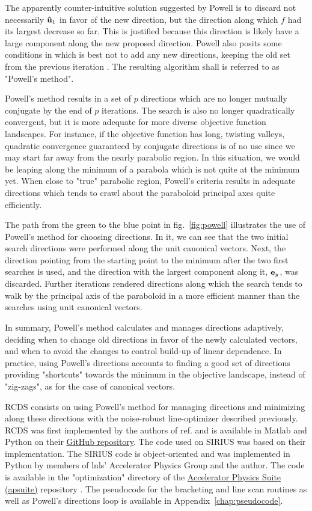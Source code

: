 The apparently counter-intuitive solution suggested by Powell is to discard not necessarily $\vu{u}_1$ in favor of the new direction, but the direction along which $f$ had its largest decrease so far. This is justified because this direction is likely have a large component along the new proposed  direction. Powell also posits some conditions in which is best not to add any new directions, keeping the old set from the previous iteration \cite[section 10.7]{press_numerical_2007}. The resulting algorithm shall is referred to as "Powell's method".

Powell's method results in a set of $p$ directions which are no longer mutually conjugate by the end of $p$ iterations. The search is also no longer quadratically convergent, but it is more adequate for more diverse objective function landscapes. For instance, if the objective function has long, twisting valleys, quadratic convergence guaranteed by conjugate directions is of no use since we  may start far away from the nearly parabolic region. In this situation, we would be leaping along the minimum of a parabola which is not quite at the minimum yet. When close to "true" parabolic region, Powell's criteria results in adequate directions which tends to crawl about the paraboloid principal axes quite efficiently.

The path from the green to the blue point in fig.~\ref{fig:powell} illustrates the use of Powell's method for choosing directions. In it, we can see that the two initial search directions were performed along the unit canonical vectors. Next, the direction pointing from the starting point to the minimum after the two first searches is used, and the direction with the largest component along it, $\vb{e}_y$, was discarded. Further iterations rendered directions along which the search tends to walk by the principal axis of the paraboloid in a more efficient manner than the searches using unit canonical vectors.

In summary, Powell's method calculates and manages directions adaptively, deciding when to change old directions in favor of the newly calculated  vectors, and when to avoid the changes to control build-up of linear dependence. In practice, using Powell's directions accounts to finding a good set of directions providing "shortcuts" towards the minimum in the objective landscape, instead of "zig-zags", as for the case of canonical vectors.

\gls*{RCDS} consists on using Powell's method for managing directions and minimizing along these directions with the noise-robust line-optimizer described previously. \gls*{RCDS} was first implemented by the authors of ref.\cite{huang_algorithm_2013} and is available in Matlab and Python on their \href{https://github.com/SPEAR3-ML/RCDS}{GitHub repository}. The code used on SIRIUS was based on their implementation. The SIRIUS code is object-oriented and was  implemented in Python by members of \gls*{lnls}' Accelerator Physics Group and the author. The code is available in the "optimization" directory of the \href{https://github.com/lnls-fac/apsuite}{Accelerator Physics Suite (apsuite)} repository \cite{apsuite}. The pseudocode for the bracketing and line scan routines as well as Powell's directions loop is available in Appendix~\ref{chap:pseudocode}.
